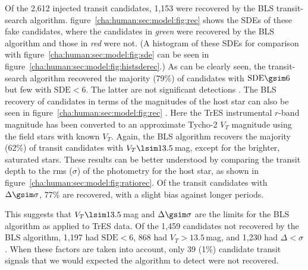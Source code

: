 Of the 2,612 injected transit candidates, 1,153 were recovered by the BLS transit-search algorithm. 
figure~\ref{cha:human:sec:model:fig:rec} %
shows the SDEs of these fake candidates, where the candidates in {\it green} were recovered by the BLS algorithm and those in {\it red} were not. 
(A histogram of these SDEs for comparison with figure~\ref{cha:human:sec:model:fig:sde} can be seen in figure~\ref{cha:human:sec:model:fig:histsderec}.)
As can be clearly seen, the transit-search algorithm recovered the majority (79\%) of candidates with $\mathrm{SDE} \gsim 6$ but few with $\mathrm{SDE} < 6$. The latter are not significant detections \citep[see][]{Kovacs_Zucker_Mazeh:aa:2002a}. 
The BLS recovery of candidates in terms of the magnitudes of the host star can also be seen in figure~\ref{cha:human:sec:model:fig:rec}%
.
Here the TrES instrumental $r$-band magnitude has been converted to an approximate Tycho-2 \citep{Hog_Fabricius_Makarov:aa:2000a} $V_{T}$ magnitude using the field stars with known $V_{T}$. 
Again, the BLS algorithm recovers the majority (62\%) of transit candidates with $V_{T}\lsim 13.5$\,mag, except for the brighter, saturated stars.
These results can be better understood by comparing the transit depth to the rms ($\sigma$) of the photometry for the host star, as shown in figure~\ref{cha:human:sec:model:fig:ratiorec}. Of the transit candidates with $\Delta \gsim \sigma$,  77\% are recovered, with a slight bias against longer periods.

This suggests that $V_{T}\lsim 13.5$\,mag and $\Delta \gsim \sigma$ are the limits for the BLS algorithm as applied to TrES data.
Of the 1,459 candidates not recovered by the BLS algorithm, 1,197 had $\mathrm{SDE} < 6$, 868 had $V_{T}> 13.5$\,mag, and 1,230 had $\Delta < \sigma$. When these factors are taken into account, only 39 (1\%) candidate transit signals that we would expected the algorithm to detect were not recovered. 

